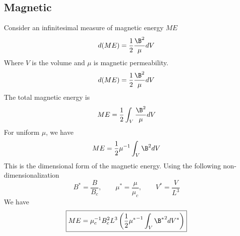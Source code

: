 \documentclass[11pt]{article}
\begin{document}
\subsection{Magnetic}
Consider an infinitesimal measure of magnetic energy $ME$
\begin{equation}
	d(ME) = \frac{1}{2} \frac{\B^2}{\mu} dV
\end{equation}
Where $V$ is the volume and $\mu$ is magnetic permeability.
\begin{equation}
	d(ME) = \frac{1}{2} \frac{\B^2}{\mu} dV
\end{equation}
The total magnetic energy is
\begin{equation}
	ME = \frac{1}{2} \int_V \frac{\B^2}{\mu} dV
\end{equation}
For uniform $\mu$, we have
\begin{equation}
	ME = \frac{1}{2} \mu^{-1} \int_V \B^2 dV
\end{equation}
This is the dimensional form of the magnetic energy. Using the following non-dimensionalization
\begin{equation}
	B^* = \frac{B}{B_c},
	\qquad
	\mu^* = \frac{\mu}{\mu_c},
	\qquad
	V^* = \frac{V}{L^3}
\end{equation}
We have
\begin{equation}
	\boxed{
	ME = \mu_c^{-1} B_c^2 L^3 \left( \frac{1}{2} {\mu^*}^{-1} \int_V {\B^*}^2 dV^* \right)
	}
\end{equation}
\end{document}
